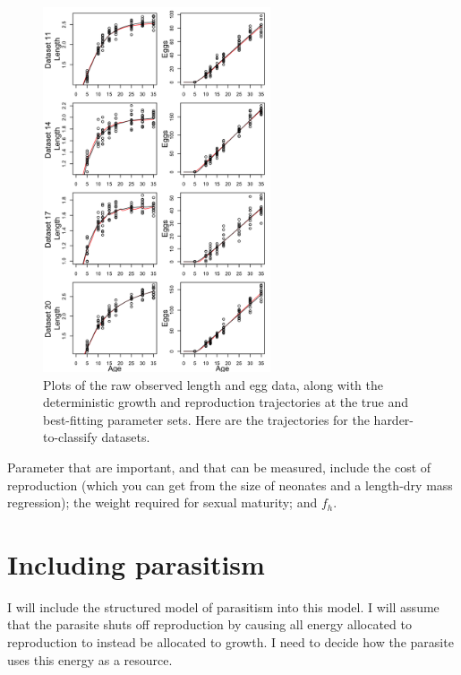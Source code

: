 \documentclass[12pt,reqno,final,pdftex]{amsart}\usepackage[]{graphicx}\usepackage[]{color}
\newenvironment{knitrout}{}{} %
\theoremstyle{plain}
\numberwithin{equation}{part}
\begin{document}
\begin{knitrout}\scriptsize
{}\color{fgcolor}\begin{figure}

\includegraphics[width=0.6\textwidth]{figure/unnamed-chunk-8-1} \hfill{}

\caption[Plots of the raw observed length and egg data, along with the deterministic growth and reproduction trajectories at the true and best-fitting parameter sets]{Plots of the raw observed length and egg data, along with the deterministic growth and reproduction trajectories at the true and best-fitting parameter sets. Here are the trajectories for the harder-to-classify datasets.}\label{fig:unnamed-chunk-8}
\end{figure}


\end{knitrout}

\clearpage


Parameter that are important, and that can be measured, include the cost of reproduction (which you can get from the size of neonates and a length-dry mass regression); the weight required for sexual maturity; and $f_h$.


\clearpage
\section*{Including parasitism}
I will include the structured model of parasitism into this model.
I will assume that the parasite shuts off reproduction by causing all energy allocated to reproduction to instead be allocated to growth.
I need to decide how the parasite uses this energy as a resource.
\end{document}
